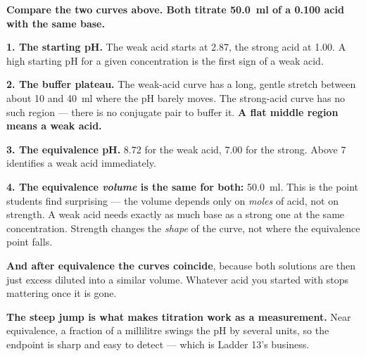 \documentclass{apchem-worksheet}
\begin{document}
\begin{center}
\end{center}

\begin{workedexample}
\textbf{Compare the two curves above. Both titrate
\SI{50.0}{\milli\litre} of a \SI{0.100}{\Molar} acid with the same
base.}

\textbf{1. The starting pH.} The weak acid starts at 2.87, the strong
acid at 1.00. A high starting pH for a given concentration is the first
sign of a weak acid.

\textbf{2. The buffer plateau.} The weak-acid curve has a long, gentle
stretch between about 10 and \SI{40}{\milli\litre} where the pH barely
moves. The strong-acid curve has no such region --- there is no
conjugate pair to buffer it. \textbf{A flat middle region means a weak
acid.}

\textbf{3. The equivalence pH.} 8.72 for the weak acid, 7.00 for the
strong. Above 7 identifies a weak acid immediately.

\textbf{4. The equivalence \emph{volume} is the same for both:}
\SI{50.0}{\milli\litre}. This is the point students find surprising ---
the volume depends only on \emph{moles} of acid, not on strength. A weak
acid needs exactly as much base as a strong one at the same
concentration. Strength changes the \emph{shape} of the curve, not
where the equivalence point falls.

\textbf{And after equivalence the curves coincide}, because both
solutions are then just excess  diluted into a similar volume.
Whatever acid you started with stops mattering once it is gone.

\textbf{The steep jump is what makes titration work as a measurement.}
Near equivalence, a fraction of a millilitre swings the pH by several
units, so the endpoint is sharp and easy to detect --- which is Ladder
13's business.
\end{workedexample}
\end{document}
